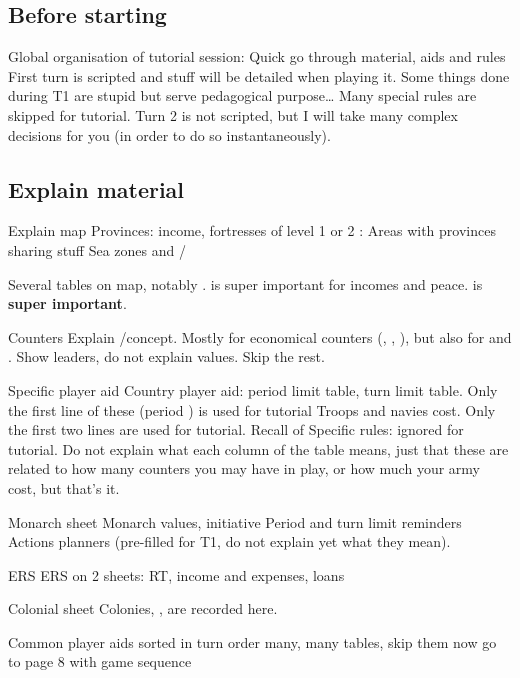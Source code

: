 \subsection{Before starting}
\aparag Global organisation of tutorial session:
\bparag Quick go through material, aids and rules
\bparag First turn is scripted and stuff will be detailed when playing it.
\bparag Some things done during T1 are stupid but serve pedagogical
purpose\ldots
\bparag Many special rules are skipped for tutorial.
\bparag Turn 2 is not scripted, but I will take many complex decisions for you
(in order to do so instantaneously).

\subsection{Explain material}
\aparag Explain map
\bparag Provinces: income, fortresses of level 1 or 2
\bparag \ROTW: Areas with provinces sharing stuff
\bparag Sea zones and \CTZ/\STZ

\aparag \STAB
\bparag Several tables on \ROTW map, notably \STAB.
\bparag \STAB is super important for incomes and peace.
\bparag \STAB is \textbf{super important}.

\aparag Counters
\bparag Explain \faceplus/\facemoins concept. Mostly for economical counters
(\COL, \TP, \TradeFLEET), but also for \ARMY and \FLEET.
\bparag Show leaders, do not explain values.
\bparag Skip the rest.

\aparag Specific player aid
\bparag Country player aid: period limit table, turn limit table. Only the
first line of these (period ) is used for tutorial
\bparag Troops and navies cost. Only the first two lines are used for tutorial.
\bparag Recall of Specific rules: ignored for tutorial.
\bparag Do not explain what each column of the table means, just that these
are related to how many counters you may have in play, or how much your army
cost, but that's it.

\aparag Monarch sheet
\bparag Monarch values, initiative
\bparag Period and turn limit reminders
\bparag Actions planners (pre-filled for T1, do not explain yet what they
mean).

\aparag ERS
 ERS on 2 sheets: RT, income and expenses, loans

\aparag Colonial sheet
\bparag Colonies, \TP, \TradeFLEET are recorded here.

\aparag Common player aids
\bparag sorted in turn order
\bparag many, many tables, skip them now
\bparag go to page 8 with game sequence

